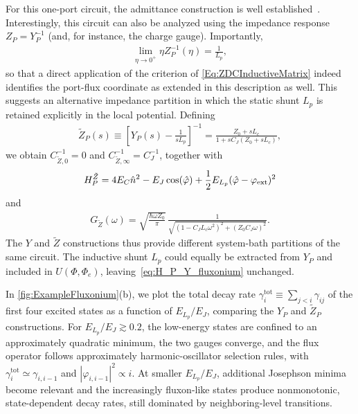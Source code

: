 \documentclass[prx,aps,twocolumn,article]{revtex4-2}
\begin{document}
For this one-port circuit, the admittance construction is
well established~\cite{CaldeiraLeggett_QT:1983,Esteve:1986,Devoret:1997}. Interestingly, this circuit can also be analyzed using  the impedance response $Z_P=Y_P^{-1}$ (and, for instance, the charge gauge). Importantly,
\begin{align}
    \lim_{\eta\to0^+}\eta Z_P^{-1}(\eta)=\frac{1}{L_p},
\end{align}
so that a direct application of the criterion of
\cref{Eq:ZDCInductiveMatrix} indeed identifies the port-flux coordinate as extended in this description as well. This suggests an alternative impedance partition in which the static shunt $L_p$ is retained explicitly in the local potential. Defining
\begin{align}
    \tilde{Z}_P(s)
    \equiv
    \left[
        Y_P(s)-\frac{1}{sL_p}
    \right]^{-1}
    =
    \frac{Z_0+sL_c}
    {1+sC_J(Z_0+sL_c)},
    \label{Eq:FluxoniumZtilde}
\end{align}
we obtain $C_{\tilde Z,0}^{-1}=0$ and
$C_{\tilde Z,\infty}^{-1}=C_J^{-1}$, together with
\begin{align}
    H_P^{\tilde Z}
    =
    4E_C\hat n^2
    -E_J\cos(\hat\varphi)
    +\frac{1}{2}E_{L_p}
    (\hat\varphi-\varphi_{\rm ext})^2
\end{align}
and
\begin{align}
    G_{\tilde Z}(\omega)
    =
    \sqrt{\frac{\hbar\omega Z_0}{\pi}}\,
    \frac{1}{
    \sqrt{
        (1-C_JL_c\omega^2)^2
        +(Z_0C_J\omega)^2
    }}.
    \label{Eq:FluxoniumGZtilde}
\end{align}
The $Y$ and $\tilde Z$ constructions thus provide different system-bath partitions of the same circuit. The inductive shunt $L_p$ could equally be extracted from $Y_P$ and included in $U(\Phi,\Phi_e)$, leaving~\cref{eq:H_P_Y_fluxonium} unchanged.


In \cref{fig:ExampleFluxonium}(b), we plot the total decay rate $\gamma_i^{\mathrm{tot}}\equiv\sum_{j<i}\gamma_{ij}$ of the first four excited states as a function of $E_{L_p}/E_J$, comparing the $Y_P$ and $\tilde{Z}_P$ constructions. For $E_{L_p}/E_J\gtrsim0.2$, the low-energy states are confined to an approximately quadratic minimum, the two gauges converge, and
the flux operator follows approximately harmonic-oscillator selection rules, with $\gamma_i^{\mathrm{tot}}\simeq\gamma_{i,i-1}$ and
$|\varphi_{i,i-1}|^2\propto i$. At smaller $E_{L_p}/E_J$, additional Josephson minima become relevant and the increasingly fluxon-like states
produce nonmonotonic, state-dependent decay rates, still dominated by neighboring-level transitions.
\end{document}
